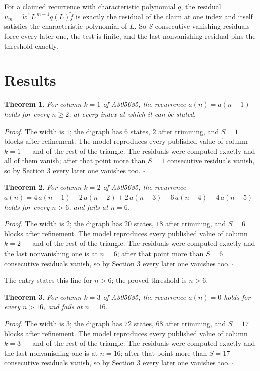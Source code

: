 \documentclass[11pt]{article}
\newtheorem{theorem}{Theorem}
\theoremstyle{definition}
\begin{document}
For a claimed recurrence with characteristic polynomial $q$, the residual $u_m = \tilde w^{\mathsf T}L^{\,m-1}q(L)\tilde f$ is exactly the residual of the claim at one index and itself satisfies the characteristic polynomial of $L$. So $S$ consecutive vanishing residuals force every later one, the test is finite, and the last nonvanishing residual pins the threshold exactly.

\section{Results}

\begin{theorem} For column $k = 1$ of A305685, the recurrence $a(n) = a(n-1)$ holds for every $n \ge 2$, at every index at which it can be stated.\end{theorem}

{\itshape Proof.} The width is $1$; the digraph has $6$ states, $2$ after trimming, and $S = 1$ blocks after refinement. The model reproduces every published value of column $k = 1$ --- and of the rest of the triangle. The residuals were computed exactly and all of them vanish; after that point more than $S = 1$ consecutive residuals vanish, so by Section 3 every later one vanishes too. $\square$

\begin{theorem} For column $k = 2$ of A305685, the recurrence $a(n) = 4\,a(n-1) - 2\,a(n-2) + 2\,a(n-3) - 6\,a(n-4) - 4\,a(n-5)$ holds for every $n > 6$, and fails at $n = 6$.\end{theorem}

{\itshape Proof.} The width is $2$; the digraph has $20$ states, $18$ after trimming, and $S = 6$ blocks after refinement. The model reproduces every published value of column $k = 2$ --- and of the rest of the triangle. The residuals were computed exactly and the last nonvanishing one is at $n = 6$; after that point more than $S = 6$ consecutive residuals vanish, so by Section 3 every later one vanishes too. $\square$

The entry states this line for $n > 6$; the proved threshold is $n > 6$.

\begin{theorem} For column $k = 3$ of A305685, the recurrence $a(n) = 0$ holds for every $n > 16$, and fails at $n = 16$.\end{theorem}

{\itshape Proof.} The width is $3$; the digraph has $72$ states, $68$ after trimming, and $S = 17$ blocks after refinement. The model reproduces every published value of column $k = 3$ --- and of the rest of the triangle. The residuals were computed exactly and the last nonvanishing one is at $n = 16$; after that point more than $S = 17$ consecutive residuals vanish, so by Section 3 every later one vanishes too. $\square$
\end{document}
